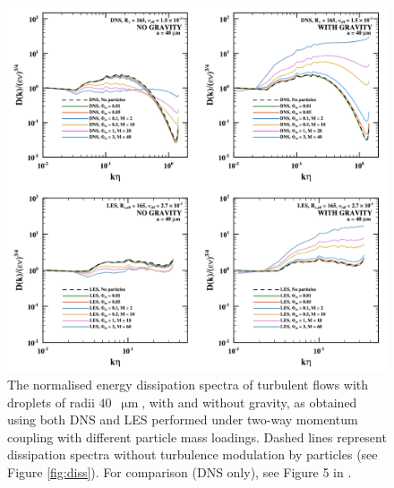 \begin{figure}
\centering
\includegraphics[width=13.5cm]{figures/2-04_moddiss.pdf}
\caption{
The normalised energy dissipation spectra of turbulent flows with droplets of radii $40$~$\upmu\text{m}$, with and without gravity, as obtained using both DNS and LES performed under two-way momentum coupling with different particle mass loadings.
Dashed lines represent dissipation spectra without turbulence modulation by particles (see Figure \ref{fig:diss}).
For comparison (DNS only), see Figure 5 in \textcite{Rosa2020}.
}
\label{fig:moddiss}
\end{figure}


